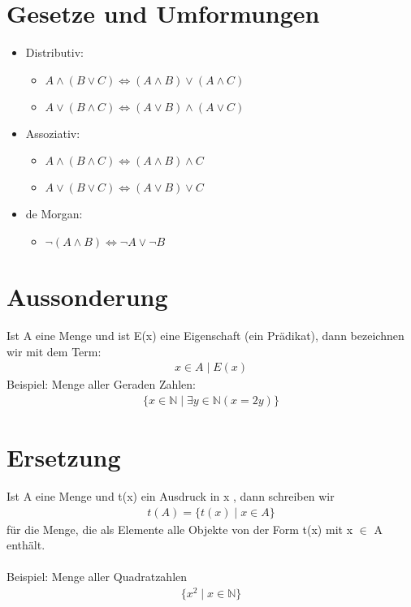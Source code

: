 \section{Gesetze und Umformungen}
\begin{itemize}
    \item Distributiv:
        \begin{itemize}
            \item \(A \wedge (B \vee C) \Leftrightarrow (A \wedge B) \vee (A \wedge C)\)
            \item \(A \vee (B \wedge C) \Leftrightarrow (A \vee B) \wedge (A \vee C)\)
        \end{itemize}
    
    \item Assoziativ:
        \begin{itemize}
            \item \(A \wedge (B \wedge C) \Leftrightarrow (A \wedge B) \wedge C\)
            \item \(A \vee (B \vee C) \Leftrightarrow (A \vee B) \vee C\)
        \end{itemize}
    
    \item de Morgan:
        \begin{itemize}
            \item \(\neg (A \wedge B) \Leftrightarrow \neg A \vee \neg B\)
        \end{itemize}
\end{itemize}

\section{Aussonderung}
Ist A eine Menge und ist E(x) eine Eigenschaft (ein Prädikat), dann
bezeichnen wir mit dem Term:
\begin{align*}
    x \in A \mid E(x)
\end{align*}
Beispiel: Menge aller Geraden Zahlen:
\begin{align*}
    \{x \in \mathbb{N} \mid \exists{y} \in \mathbb{N}(x= 2y)\}
\end{align*}
\section{Ersetzung}
Ist A eine Menge und t(x) ein Ausdruck in x , dann schreiben wir
\begin{align*}
    t(A) = \{t(x) \mid x \in A\}
\end{align*}
für die Menge, die als Elemente alle Objekte von der Form t(x) mit
x \(\in\) A enthält.\\\\
Beispiel: Menge aller Quadratzahlen
\begin{align*}
    \{x^2 \mid x \in \mathbb{N}\}
\end{align*}

